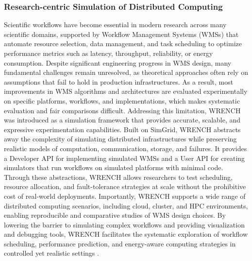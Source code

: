 \subsubsection{Research-centric Simulation of Distributed Computing}
\label{sec:background_simulation}
Scientific workflows have become essential in modern research across many scientific domains, supported by Workflow Management Systems (WMSs) that automate resource selection, data management, and task scheduling to optimize performance metrics such as latency, throughput, reliability, or energy consumption. Despite significant engineering progress in WMS design, many fundamental challenges remain unresolved, as theoretical approaches often rely on assumptions that fail to hold in production infrastructures. As a result, most improvements in WMS algorithms and architectures are evaluated experimentally on specific platforms, workflows, and implementations, which makes systematic evaluation and fair comparisons difficult. Addressing this limitation, WRENCH was introduced as a simulation framework that provides accurate, scalable, and expressive experimentation capabilities. Built on SimGrid, WRENCH abstracts away the complexity of simulating distributed infrastructures while preserving realistic models of computation, communication, storage, and failures. It provides a Developer API for implementing simulated WMSs and a User API for creating simulators that run workflows on simulated platforms with minimal code. Through these abstractions, WRENCH allows researchers to test scheduling, resource allocation, and fault-tolerance strategies at scale without the prohibitive cost of real-world deployments. Importantly, WRENCH supports a wide range of distributed computing scenarios, including cloud, cluster, and HPC environments, enabling reproducible and comparative studies of WMS design choices. By lowering the barrier to simulating complex workflows and providing visualization and debugging tools, WRENCH facilitates the systematic exploration of workflow scheduling, performance prediction, and energy-aware computing strategies in controlled yet realistic settings \cite{wrench}.






